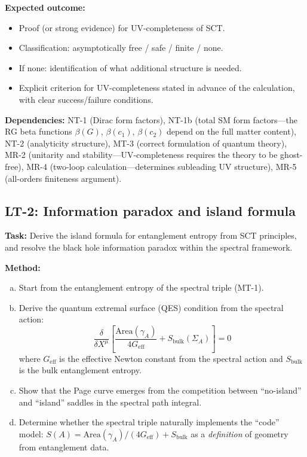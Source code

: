 \documentclass[12pt,a4paper]{article}
\newcommand{\task}[1]{\noindent\textbf{Task:} #1\par}
\newcommand{\method}[1]{\noindent\textbf{Method:} #1\par}
\newcommand{\outcome}[1]{\noindent\textbf{Expected outcome:} #1\par}
\newcommand{\deps}[1]{\noindent\textbf{Dependencies:} #1\par}
\begin{document}
\outcome{
\begin{itemize}
  \item Proof (or strong evidence) for UV-completeness of SCT.
  \item Classification: asymptotically free / safe / finite / none.
  \item If none: identification of what additional structure is needed.
  \item Explicit criterion for UV-completeness stated in advance of the
    calculation, with clear success/failure conditions.
\end{itemize}
}

\deps{NT-1 (Dirac form factors), NT-1b (total SM form factors---the RG beta
functions $\beta(G)$, $\beta(c_1)$, $\beta(c_2)$ depend on the full
matter content), NT-2 (analyticity structure), MT-3 (correct formulation
of quantum theory), MR-2 (unitarity and stability---UV-completeness requires
the theory to be ghost-free), MR-4 (two-loop calculation---determines
subleading UV structure), MR-5 (all-orders finiteness argument).}

\subsection{LT-2: Information paradox and island formula}
\label{task:LT2}

\task{Derive the island formula for entanglement entropy from SCT principles,
and resolve the black hole information paradox within the spectral framework.}

\method{
\begin{enumerate}[(a)]
  \item Start from the entanglement entropy of the spectral triple (MT-1).
  \item Derive the quantum extremal surface (QES) condition from the spectral action:
    \begin{equation}\label{eq:qes}
      \frac{\delta}{\delta X^\mu}\left[
      \frac{\text{Area}(\gamma_A)}{4G_{\text{eff}}} + S_{\text{bulk}}(\Sigma_A)
      \right] = 0
    \end{equation}
    where $G_{\text{eff}}$ is the effective Newton constant from the spectral action
    and $S_{\text{bulk}}$ is the bulk entanglement entropy.
  \item Show that the Page curve emerges from the competition between
    ``no-island'' and ``island'' saddles in the spectral path integral.
  \item Determine whether the spectral triple naturally implements the
    ``code'' model: $S(A) = \text{Area}(\gamma_A)/(4G_{\text{eff}}) + S_{\text{bulk}}$
    as a \emph{definition} of geometry from entanglement data.
\end{enumerate}
}
\end{document}
